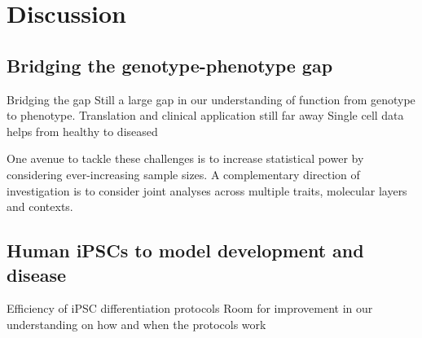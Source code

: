 
\chapter{Discussion}  %
\label{chapter7}

\section{Bridging the genotype-phenotype gap}

Bridging the gap
Still a large gap in our understanding of function from genotype to phenotype.
Translation and clinical application still far away
Single cell data helps
from healthy to diseased

One avenue to tackle these challenges is to increase statistical power by considering
ever-increasing sample sizes. 
A complementary direction of investigation is to consider joint analyses across multiple traits, molecular layers and contexts.

\section{Human iPSCs to model development and disease}

Efficiency of iPSC differentiation protocols
Room for improvement in our understanding on how and when the protocols work




